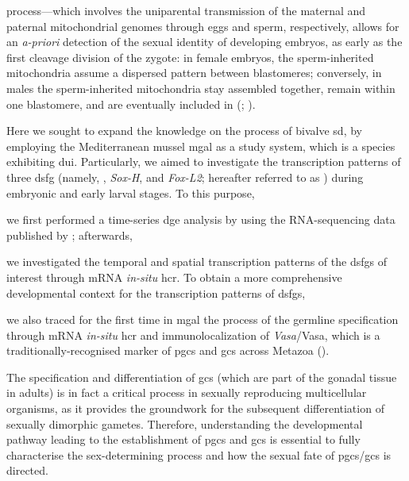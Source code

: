 process---which involves the uniparental transmission of the maternal and paternal mitochondrial genomes through eggs and sperm, respectively, allows for an \textit{a-priori} detection of the sexual identity of developing embryos, as early as the first cleavage division of the zygote: in female embryos, the sperm-inherited mitochondria assume a dispersed pattern between blastomeres; conversely, in males the sperm-inherited mitochondria stay assembled together, remain within one blastomere, and are eventually included in  (; ).

Here we sought to expand the knowledge on the process of bivalve \gls{sd}, by employing the Mediterranean mussel \gls{mgal} as a study system, which is a species exhibiting \gls{dui}. Particularly, we aimed to investigate the transcription patterns of three \gls{dsfg} (namely, , \textit{Sox-H}, and \textit{Fox-L2}; hereafter referred to as ) during embryonic and early larval stages. To this purpose,
\begin{inlinelist}
	\item we first performed a time-series \gls{dge} analysis by using the RNA-sequencing data published by ; afterwards,
	\item we investigated the temporal and spatial transcription patterns of the \glspl{dsfg} of interest through mRNA \textit{in-situ} \gls{hcr}. To obtain a more comprehensive developmental context for the transcription patterns of \glspl{dsfg},
	\item we also traced for the first time in \gls{mgal} the process of the germline specification through mRNA \textit{in-situ} \gls{hcr} and immunolocalization of \textit{Vasa}/Vasa, which is a traditionally-recognised marker of \glspl{pgc} and \glspl{gc} across Metazoa ().
\end{inlinelist}
The specification and differentiation of \glspl{gc} (which are part of the gonadal tissue in adults) is in fact a critical process in sexually reproducing multicellular organisms, as it provides the groundwork for the subsequent differentiation of sexually dimorphic gametes. Therefore, understanding the developmental pathway leading to the establishment of \glspl{pgc} and \glspl{gc} is essential to fully characterise the sex-determining process and how the sexual fate of \glspl{pgc}/\glspl{gc} is directed.

